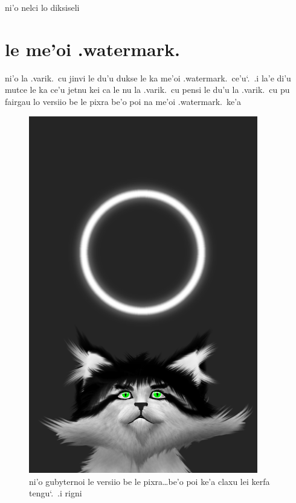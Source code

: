 \documentclass{report}
\newcommand\sds{\spacefactor\sfcode`.\ \space}
\begin{document}
ni'o nelci lo diksiseli

\section{le me'oi .watermark.}
ni'o la .varik.\ cu jinvi le du'u dukse le ka me'oi .watermark.\ ce'u\sds  .i la'e di'u mutce le ka ce'u jetnu kei ca le nu la .varik.\ cu pensi le du'u la .varik.\ cu pu fairgau lo versiio be le pixra be'o poi na me'oi .watermark.\ ke'a

\begin{figure}[ht]
	\centering
	\includegraphics[width=10cm]{20200414042645-03/20200414042645-03-uw.png}
	\caption[center]{ni'o gubyternoi le versiio be le pixra\ldots be'o poi ke'a claxu lei kerfa tengu\sds  .i rigni}
\end{figure}
\end{document}
